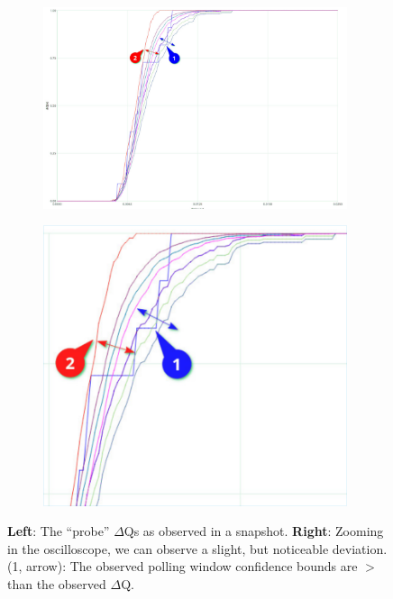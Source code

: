        \begin{figure}[H]
            \centering
            \begin{subfigure}{.5\textwidth}
                \centering
                \includegraphics[width=0.98\textwidth]{img/overload_2/150_probe2.pdf}
                \label{fig:ovuvv}
            \end{subfigure}%
            \begin{subfigure}{.5\textwidth}
                \centering
                \includegraphics[width =0.98\textwidth]{img/overload_2/150_probe2zoom_cropped.pdf}
                \label{fig:ovovv}
            \end{subfigure}
            \label{fig:avavv} 
            \caption{\textbf{Left}: The ``probe'' $\Delta$Qs as observed in a snapshot. \textbf{Right}: Zooming in the oscilloscope, we can observe a slight, but noticeable deviation. (1, arrow): The observed polling window confidence bounds are $>$ than the observed $\Delta$Q.}
        \end{figure}
       
